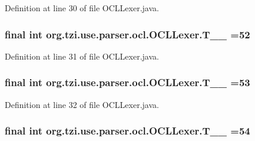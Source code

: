 Definition at line 30 of file O\-C\-L\-Lexer.\-java.

\hypertarget{classorg_1_1tzi_1_1use_1_1parser_1_1ocl_1_1_o_c_l_lexer_ae2ea078102c6f8c32bf54077698999d5}{
\subsubsection[{T\-\_\-\-\_\-52}]{\setlength{\rightskip}{0pt plus 5cm}final int org.\-tzi.\-use.\-parser.\-ocl.\-O\-C\-L\-Lexer.\-T\-\_\-\-\_ =52\hspace{0.3cm}{\ttfamily [static]}}}\label{classorg_1_1tzi_1_1use_1_1parser_1_1ocl_1_1_o_c_l_lexer_ae2ea078102c6f8c32bf54077698999d5}


Definition at line 31 of file O\-C\-L\-Lexer.\-java.

\hypertarget{classorg_1_1tzi_1_1use_1_1parser_1_1ocl_1_1_o_c_l_lexer_abc28f6e82c5b8906d36ca3fba69afc25}{
\subsubsection[{T\-\_\-\-\_\-53}]{\setlength{\rightskip}{0pt plus 5cm}final int org.\-tzi.\-use.\-parser.\-ocl.\-O\-C\-L\-Lexer.\-T\-\_\-\-\_ =53\hspace{0.3cm}{\ttfamily [static]}}}\label{classorg_1_1tzi_1_1use_1_1parser_1_1ocl_1_1_o_c_l_lexer_abc28f6e82c5b8906d36ca3fba69afc25}


Definition at line 32 of file O\-C\-L\-Lexer.\-java.

\hypertarget{classorg_1_1tzi_1_1use_1_1parser_1_1ocl_1_1_o_c_l_lexer_a6e7660d0512aed880fd8ab4d6cee6a49}{
\subsubsection[{T\-\_\-\-\_\-54}]{\setlength{\rightskip}{0pt plus 5cm}final int org.\-tzi.\-use.\-parser.\-ocl.\-O\-C\-L\-Lexer.\-T\-\_\-\-\_ =54\hspace{0.3cm}{\ttfamily [static]}}}\label{classorg_1_1tzi_1_1use_1_1parser_1_1ocl_1_1_o_c_l_lexer_a6e7660d0512aed880fd8ab4d6cee6a49}


